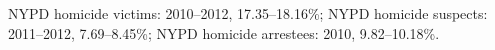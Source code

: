 NYPD homicide victims: 2010--2012, 17.35--18.16\%; NYPD homicide suspects: 2011--2012, 7.69--8.45\%; NYPD homicide arrestees: 2010, 9.82--10.18\%.
